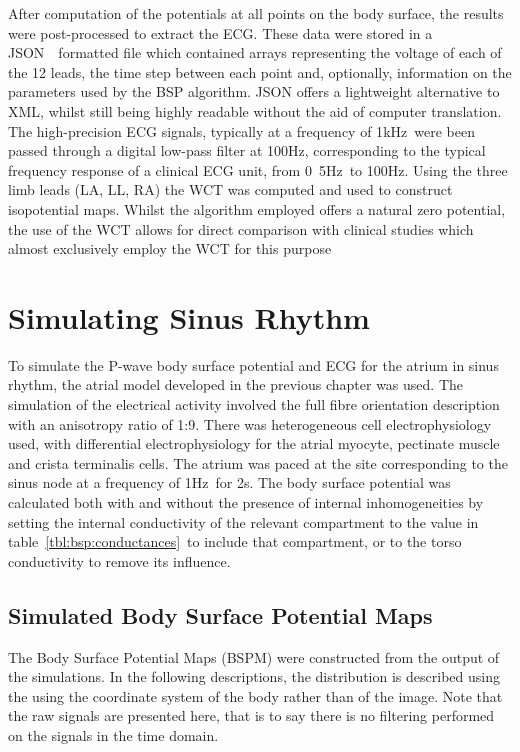 After computation of the potentials at all points on the body surface, the
results were post-processed to extract the ECG.
These data were stored in a JSON~\cite{json}\ formatted file which contained
arrays representing the voltage of each of the 12 leads, the time step between
each point and, optionally, information on the parameters used by the BSP
algorithm.
JSON offers a lightweight alternative to XML, whilst still being highly readable
without the aid of computer translation.
The high-precision ECG signals, typically at a frequency of \unit{1}{kHz}\
were been passed through a digital low-pass filter at \unit{100}{Hz},
corresponding to the typical frequency response of a clinical ECG unit, from
\unit{0.5}{Hz}\ to \unit{100}{Hz}.
Using the three limb leads (LA, LL, RA) the WCT was computed and used to
construct isopotential maps.
Whilst the algorithm employed offers a natural zero potential, the use of the
WCT allows for direct comparison with clinical studies which almost exclusively
employ the WCT for this purpose~\cite{Taccardi1966,Mirvis1980}


\section{Simulating Sinus Rhythm}

To simulate the P-wave body surface potential and ECG for the atrium in sinus
rhythm, the atrial model developed in the previous chapter was used.
The simulation of the electrical activity involved the full fibre orientation
description with an anisotropy ratio of 1:9.
There was heterogeneous cell electrophysiology used, with differential
electrophysiology for the atrial myocyte, pectinate muscle and crista
terminalis cells.
The atrium was paced at the site corresponding to the sinus node at a frequency
of \unit{1}{Hz}\ for \unit{2}{s}.
The body surface potential was calculated both with and without the presence of
internal inhomogeneities by setting the internal conductivity of the relevant
compartment to the value in table~\ref{tbl:bsp:conductances}\ to include that
compartment, or to the torso conductivity to remove its influence.

\subsection{Simulated Body Surface Potential Maps}

The Body Surface Potential Maps (BSPM) were constructed from the output of the
simulations.
In the following descriptions, the distribution is described using the using the
coordinate system of the body rather than of the image.
Note that the raw signals are presented here, that is to say there is no
filtering performed on the signals in the time domain.

